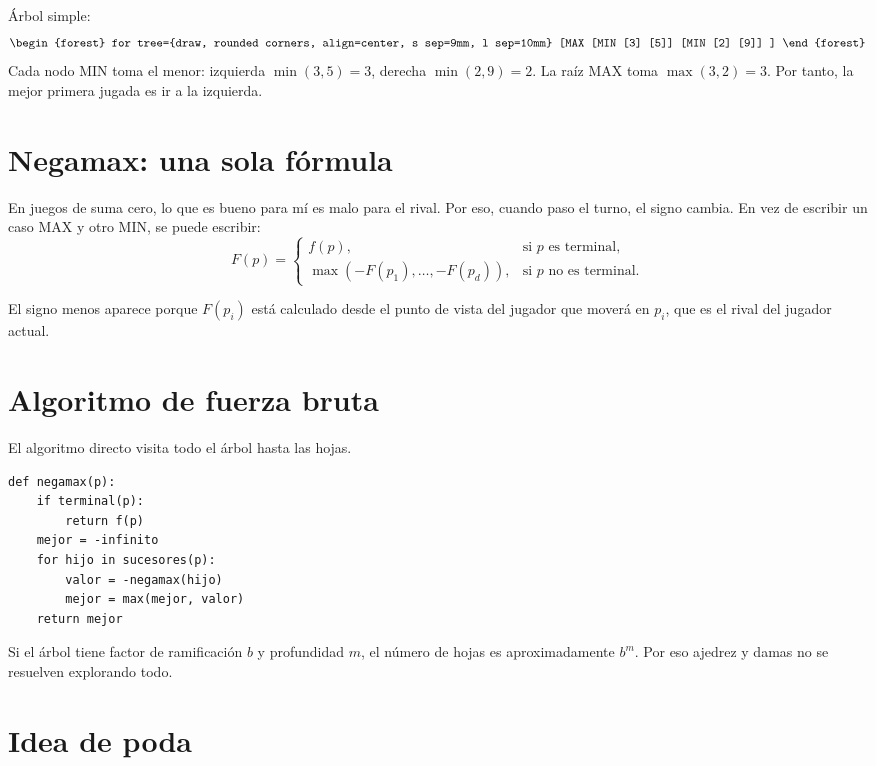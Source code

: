 \documentclass[11pt,a4paper]{article}
\theoremstyle{definition}
\begin{document}
\begin{examplebox}
Árbol simple:
\[
\begin{forest}
for tree={draw, rounded corners, align=center, s sep=9mm, l sep=10mm}
[MAX
  [MIN [3] [5]]
  [MIN [2] [9]]
]
\end{forest}
\]
Cada nodo MIN toma el menor: izquierda $\min(3,5)=3$, derecha $\min(2,9)=2$. La raíz MAX toma $\max(3,2)=3$. Por tanto, la mejor primera jugada es ir a la izquierda.
\end{examplebox}

\section{Negamax: una sola fórmula}

En juegos de suma cero, lo que es bueno para mí es malo para el rival. Por eso, cuando paso el turno, el signo cambia. En vez de escribir un caso MAX y otro MIN, se puede escribir:
\[
F(p)=\begin{cases}
 f(p), & \text{si }p\text{ es terminal},\\
 \max(-F(p_1),\ldots,-F(p_d)), & \text{si }p\text{ no es terminal}.
\end{cases}
\]

\begin{idea}
El signo menos aparece porque $F(p_i)$ está calculado desde el punto de vista del jugador que moverá en $p_i$, que es el rival del jugador actual.
\end{idea}

\section{Algoritmo de fuerza bruta}

El algoritmo directo visita todo el árbol hasta las hojas.

\begin{lstlisting}[style=pythonSoft]
def negamax(p):
    if terminal(p):
        return f(p)
    mejor = -infinito
    for hijo in sucesores(p):
        valor = -negamax(hijo)
        mejor = max(mejor, valor)
    return mejor
\end{lstlisting}

Si el árbol tiene factor de ramificación $b$ y profundidad $m$, el número de hojas es aproximadamente $b^m$. Por eso ajedrez y damas no se resuelven explorando todo.

\section{Idea de poda}
\end{document}
